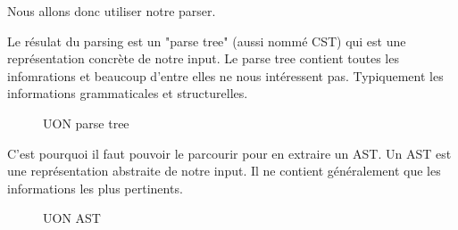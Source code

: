 \documentclass[
    iict, %
    il, %
]{heig-tb}
\begin{document}
Nous allons donc utiliser notre parser.

Le résulat du parsing est un "parse tree" (aussi nommé CST) qui est une représentation concrète de notre input. Le parse tree contient toutes les infomrations et beaucoup d'entre elles ne nous intéressent pas.
Typiquement les informations grammaticales et structurelles.
\begin{figure}[!h]
    \begin{center}
    \end{center}
    \caption[UON parse tree]{\label{parse-tree} UON parse tree}
\end{figure}

C'est pourquoi il faut pouvoir le parcourir pour en extraire un AST.
Un AST est une représentation abstraite de notre input. Il ne contient généralement que les informations les plus pertinents.

\begin{figure}[!h]
    \begin{center}
    \end{center}
    \caption[UON AST]{\label{ast} UON AST}
\end{figure}
\end{document}
